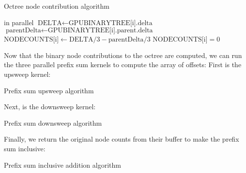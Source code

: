 \documentclass{thesis}
\begin{document}

\begin{algorithm}
    \label{alg:NodeContributions}
    \caption{Octree node contribution algorithm}
    \begin{algorithmic}
         in parallel
                \State $\text{DELTA} \gets \text{GPUBINARYTREE[i].delta}$
                \State $\text{parentDelta} \gets \text{GPUBINARYTREE[i].parent.delta}$
                \State $\text{NODECOUNTS[i]} \gets \text{DELTA}/3 - \text{parentDelta}/3$
            \Else
                \State $\text{NODECOUNTS[i]} = 0$
            \EndIf
        \EndFor
    \end{algorithmic}
\end{algorithm}

Now that the binary node contributions to the octree are computed, we can run the three parallel prefix sum kernels to compute the array of offsets:
First is the upsweep kernel:
\begin{algorithm}
    \label{alg:PrefixUpsweep}
    \caption{Prefix sum upsweep algorithm}
    \begin{algorithmic}
        \For{}
        \EndFor
    \end{algorithmic}
\end{algorithm}

Next, is the downsweep kernel:
\begin{algorithm}
    \label{alg:PrefixDownsweep}
    \caption{Prefix sum downsweep algorithm}
    \begin{algorithmic}
        \For{}
        \EndFor
    \end{algorithmic}
\end{algorithm}

Finally, we return the original node counts from their buffer to make the prefix sum inclusive:
\begin{algorithm}
    \label{alg:PrefixInclusive}
    \caption{Prefix sum inclusive addition algorithm}
    \begin{algorithmic}
        \For{}
        \EndFor
    \end{algorithmic}
\end{algorithm}
\end{document}
